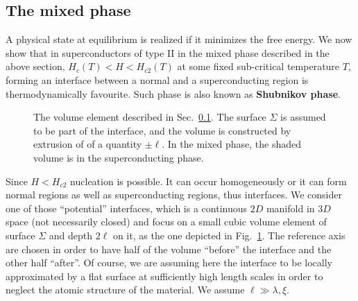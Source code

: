 \subsection{The mixed phase}\label{subsec:the mixed phase}

A physical state at equilibrium is realized if it minimizes the free energy. We now show that in superconductors of type II in the mixed phase described in the above section, $H_c(T) < H < H_{c2}(T)$ at some fixed sub-critical temperature $T$, forming an interface between a normal and a superconducting region is thermodynamically favourite. Such phase is also known as \textbf{Shubnikov phase}.

\begin{figure}
    \centering
    
    \caption{The volume element described in Sec.~\ref{subsec:the mixed phase}. The surface $\Sigma$ is assumed to be part of the interface, and the volume is constructed by extrusion of of a quantity $\pm\ell$. In the mixed phase, the shaded volume is in the superconducting phase.}
    \label{fig:interface}
\end{figure}

Since $H < H_{c2}$ nucleation is possible. It can occur homogeneously or it can form normal regions as well as superconducting regions, thus interfaces. We consider one of those ``potential'' interfaces, which is a continuous $2D$ manifold in $3D$ space (not necessarily closed) and focus on a small cubic volume element of surface $\Sigma$ and depth $2\ell$ on it, as the one depicted in Fig.~\ref{fig:interface}. The reference axis are chosen in order to have half of the volume ``before'' the interface and the other half ``after''. Of course, we are assuming here the interface to be locally approximated by a flat surface at sufficiently high length scales in order to neglect the atomic structure of the material. We assume $\ell \gg \lambda,\xi$.

